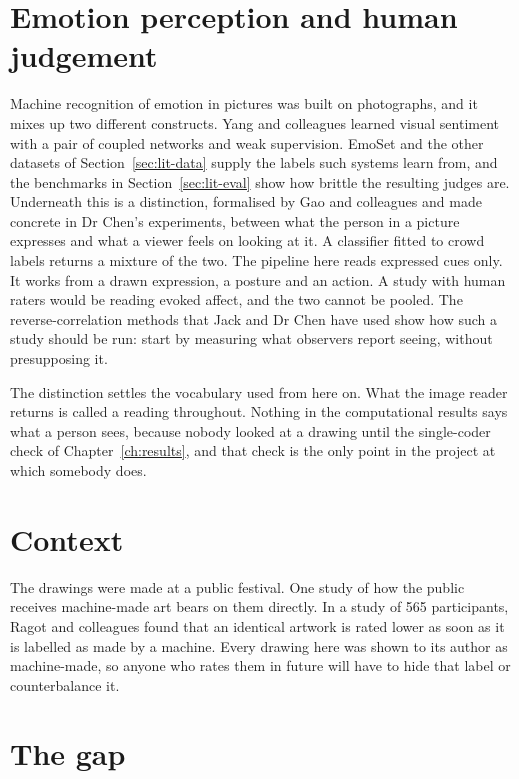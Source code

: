\section{Emotion perception and human judgement}
\label{sec:lit-perception}

Machine recognition of emotion in pictures was built on photographs, and it mixes up two different constructs. Yang and colleagues \cite{yang2018weakly} learned visual sentiment with a pair of coupled networks and weak supervision. EmoSet and the other datasets of Section~\ref{sec:lit-data} supply the labels such systems learn from, and the benchmarks in Section~\ref{sec:lit-eval} show how brittle the resulting judges are. Underneath this is a distinction, formalised by Gao and colleagues \cite{gao2025eemo} and made concrete in Dr Chen's experiments, between what the person in a picture expresses and what a viewer feels on looking at it. A classifier fitted to crowd labels returns a mixture of the two. The pipeline here reads expressed cues only. It works from a drawn expression, a posture and an action. A study with human raters would be reading evoked affect, and the two cannot be pooled. The reverse-correlation methods that Jack and Dr Chen have used \cite{jack2012facial, chen2018distinct, chen2020building, chen2024cultural} show how such a study should be run: start by measuring what observers report seeing, without presupposing it.

The distinction settles the vocabulary used from here on. What the image reader returns is called a reading throughout. Nothing in the computational results says what a person sees, because nobody looked at a drawing until the single-coder check of Chapter~\ref{ch:results}, and that check is the only point in the project at which somebody does.

\section{Context}
\label{sec:lit-context}

The drawings were made at a public festival. One study of how the public receives machine-made art bears on them directly. In a study of 565 participants, Ragot and colleagues \cite{ragot2020ai} found that an identical artwork is rated lower as soon as it is labelled as made by a machine. Every drawing here was shown to its author as machine-made, so anyone who rates them in future will have to hide that label or counterbalance it.

\section{The gap}
\label{sec:lit-gap}


